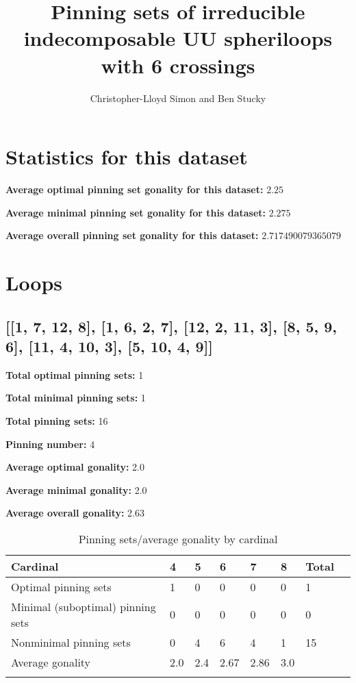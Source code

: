 \documentclass{article}%
\title{Pinning sets of irreducible indecomposable UU spheriloops with 6 crossings}
\author{Christopher-Lloyd Simon and Ben Stucky}
\begin{document}
%
\maketitle
\small

\section{Statistics for this dataset}

\noindent\textbf{Average optimal pinning set gonality for this dataset:} $2.25$

\noindent\textbf{Average minimal pinning set gonality for this dataset:} $2.275$

\noindent\textbf{Average overall pinning set gonality for this dataset:} $2.717490079365079$

\newpage\section{Loops}

\subsection{[[1, 7, 12, 8], [1, 6, 2, 7], [12, 2, 11, 3], [8, 5, 9, 6], [11, 4, 10, 3], [5, 10, 4, 9]]}

\begin{multicols}{2}
{\normalsize \noindent\textbf{Total optimal pinning sets:} 1

\noindent\textbf{Total minimal pinning sets:} 1

\noindent\textbf{Total pinning sets:} 16

\noindent\textbf{Pinning number:} 4

}
\columnbreak

{\normalsize \noindent\textbf{Average optimal gonality:} 2.0

\noindent\textbf{Average minimal gonality:} 2.0

\noindent\textbf{Average overall gonality:} 2.63

}
\end{multicols}

\begin{table}[ht]
	\caption{Pinning sets/average gonality by cardinal}
	\centering
	\renewcommand{\arraystretch}{1.5}
	\begin{tabularx}{\textwidth}{lXXXXXXX}
		\toprule
			Cardinal & 4 & 5 & 6 & 7 & 8 & Total\\
			\hline
			Optimal pinning sets & 1 & 0 & 0 & 0 & 0 & 1 \\
			Minimal (suboptimal) pinning sets & 0 & 0 & 0 & 0 & 0 & 0 \\
			Nonminimal pinning sets & 0 & 4 & 6 & 4 & 1 & 15 \\
			Average gonality & 2.0 & 2.4 & 2.67 & 2.86 & 3.0 &  \\
		\bottomrule \\ 
	\end{tabularx}
\end{table}
\end{document}

